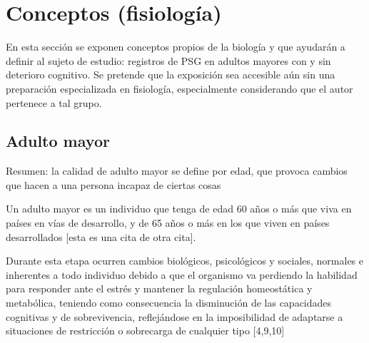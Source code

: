 \chapter{Conceptos (fisiolog\'ia)}

En esta secci\'on se exponen conceptos propios de la biolog\'ia y que ayudar\'an a definir
al sujeto de estudio: registros de PSG en adultos mayores con y sin deterioro cognitivo.
Se pretende que la exposici\'on sea accesible a\'un sin una preparaci\'on 
especializada en fisiolog\'ia, especialmente considerando que el autor pertenece a tal grupo.


\section{Adulto mayor}

Resumen: la calidad de adulto mayor se define por edad, que provoca cambios que hacen
a una persona incapaz de ciertas cosas

Un adulto mayor es un individuo que tenga de edad 
60 a\~nos o m\'as que viva en pa\'ises en v\'ias de desarrollo, y de 65 a\~nos o m\'as 
en los que viven en 
países desarrollados \cite{Hita14} [esta es una cita de otra cita].

Durante esta etapa ocurren cambios biol\'ogicos, psicol\'ogicos y sociales, normales e 
inherentes a todo individuo debido a que el organismo va perdiendo la habilidad para responder 
ante el estr\'es y mantener la regulación homeost\'atica y metabólica, teniendo como consecuencia 
la disminuci\'on de las capacidades cognitivas y de sobrevivencia, reflejándose en la imposibilidad 
de adaptarse a situaciones de restricci\'on o sobrecarga de cualquier tipo [4,9,10]

